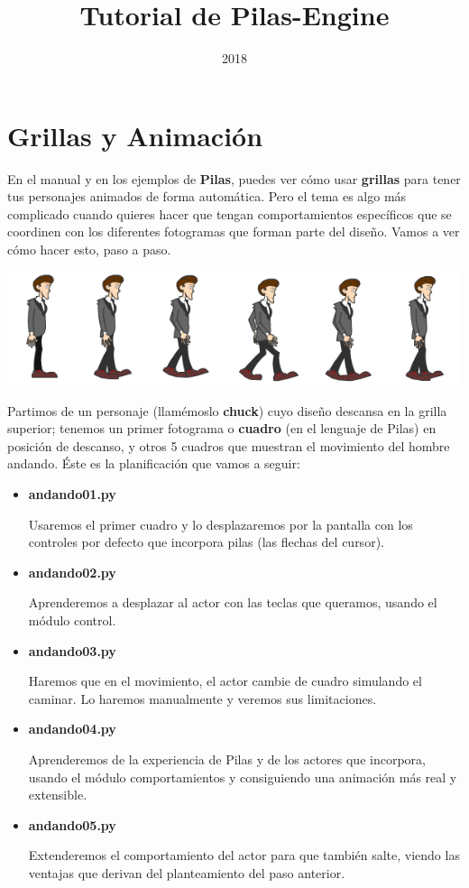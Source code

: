 \documentclass{article}
\title{Tutorial de Pilas-Engine}
\date{2018}
\begin{document}
\section{Grillas y Animación}
En el manual y en los ejemplos de \textbf{Pilas}, puedes ver cómo usar \textbf{grillas} para tener tus personajes animados de forma automática. Pero el tema es algo más complicado cuando quieres hacer que tengan comportamientos específicos que se coordinen con los diferentes fotogramas que forman parte del diseño. Vamos a ver cómo hacer esto, paso a paso.\par

\includegraphics[width=\textwidth]{andando}

Partimos de un personaje (llamémoslo \textbf{chuck}) cuyo diseño descansa en la grilla superior; tenemos un primer fotograma o \textbf{cuadro} (en el lenguaje de Pilas) en posición de descanso, y otros 5 cuadros que muestran el movimiento del hombre andando. Éste es la planificación que vamos a seguir:\par

\begin{itemize}
\item \textbf{andando01.py}

Usaremos el primer cuadro y lo desplazaremos por la pantalla con los controles por
defecto que incorpora pilas (las flechas del cursor).\par
\item \textbf{andando02.py}

Aprenderemos a desplazar al actor con las teclas que queramos, usando el módulo
control.\par
\item \textbf{andando03.py}

Haremos que en el movimiento, el actor cambie de cuadro simulando el caminar. Lo
haremos manualmente y veremos sus limitaciones.\par
\item \textbf{andando04.py}

Aprenderemos de la experiencia de Pilas y de los actores que incorpora, usando el
módulo comportamientos y consiguiendo una animación más real y extensible.\par
\item \textbf{andando05.py}

Extenderemos el comportamiento del actor para que también salte, viendo las
ventajas que derivan del planteamiento del paso anterior.\par
\end{itemize}
\end{document}
